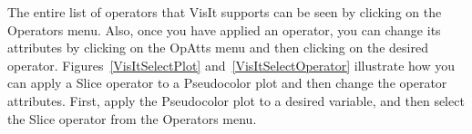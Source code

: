 The entire list of operators that VisIt supports can be seen by
clicking on the Operators menu. Also, once you have applied an
operator, you can change its attributes by clicking on the OpAtts menu
and then clicking on the desired operator.
Figures~\ref{VisItSelectPlot} and~\ref{VisItSelectOperator} illustrate
how you can apply a Slice operator to a Pseudocolor plot and then
change the operator attributes.  First, apply the Pseudocolor plot to
a desired variable, and then select the Slice operator from the
Operators menu.





\begin{figure}
  \vspace{-100pt}
  \centering
  \hspace{50pts}
  \caption{}
  \label{}
\end{figure}


\begin{figure}
  \centering
  \vspace{-20pt}
  \hspace{50pt}
  \caption{}
  \label{}
\end{figure}


